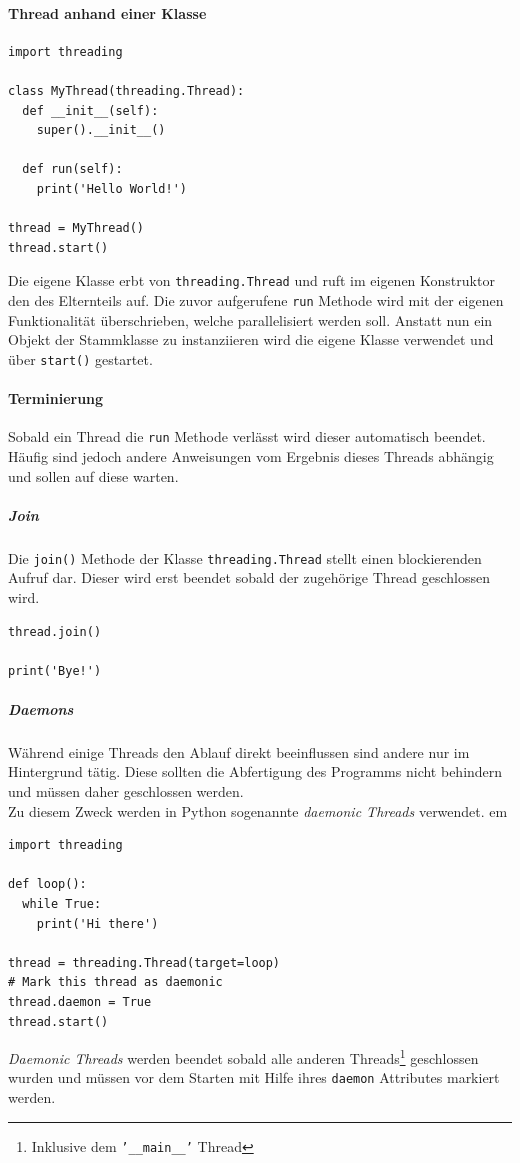 \documentclass[a4paper,11pt]{article}
\begin{document}
\paragraph{Thread anhand einer Klasse}
\begin{verbatim}
import threading
 
class MyThread(threading.Thread):
  def __init__(self):
    super().__init__()
    
  def run(self):
    print('Hello World!')
    
thread = MyThread()
thread.start()
\end{verbatim}
Die eigene Klasse erbt von \texttt{threading.Thread} und ruft im eigenen Konstruktor den des Elternteils auf.
Die zuvor aufgerufene \texttt{run} Methode wird mit der eigenen Funktionalit\"at \"uberschrieben, welche parallelisiert werden soll.
Anstatt nun ein Objekt der Stammklasse zu instanziieren wird die eigene Klasse verwendet und \"uber \texttt{start()} gestartet.

\newpage

\paragraph{Terminierung}
\begin{flushleft}
Sobald ein Thread die \texttt{run} Methode verl\"asst wird dieser automatisch beendet.
H\"aufig sind jedoch andere Anweisungen vom Ergebnis dieses Threads abh\"angig und sollen auf diese warten.
\end{flushleft}
\subparagraph{Join}
Die \texttt{join()} Methode der Klasse \texttt{threading.Thread} stellt einen blockierenden Aufruf dar.
Dieser wird erst beendet sobald der zugeh\"orige Thread geschlossen wird.
\begin{verbatim}
thread.join()

print('Bye!')
\end{verbatim}

\subparagraph{Daemons}
W\"ahrend einige Threads den Ablauf direkt beeinflussen sind andere nur im Hintergrund t\"atig.
Diese sollten die Abfertigung des Programms nicht behindern und m\"ussen daher geschlossen werden.\\
Zu diesem Zweck werden in Python sogenannte \textit{daemonic Threads} verwendet.
 em
\begin{verbatim}
import threading

def loop():
  while True:
    print('Hi there')

thread = threading.Thread(target=loop)
# Mark this thread as daemonic
thread.daemon = True
thread.start()
\end{verbatim}
\textit{Daemonic Threads} werden beendet sobald alle anderen Threads\footnote{Inklusive dem \texttt{'__main__'} Thread} geschlossen wurden und m\"ussen vor dem Starten mit Hilfe ihres \texttt{daemon} Attributes markiert werden.
\end{document}
